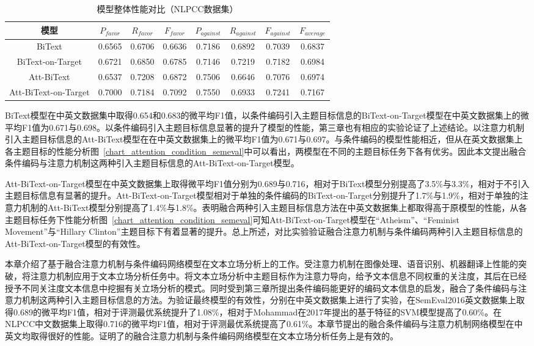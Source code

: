 \begin{table}[htbp]
	\caption[table123]{模型整体性能对比（NLPCC数据集）}
	\label{nlcpp_all_model1}
	\vspace{0.5em}\centering\wuhao
	\begin{tabular}{cccccccc}
		\toprule[1.5pt]
		模型& $P_{favor}$&$R_{favor}$&$F_{favor}$&$P_{against}$&$R_{against}$&$F_{against}$&$F_{average}$ \\
		\midrule[1pt]
		BiText&0.6565&0.6706&0.6636&0.7186&0.6892&0.7039&0.6837\\
		BiText-on-Target&0.6721&0.6850&0.6785&0.7146&0.7219&0.7182&0.6984\\
		Att-BiText&0.6537&0.7208&0.6872&0.7506&0.6646&0.7076&0.6974\\
		Att-BiText-on-Target&0.7000&0.7184&0.7092&0.7550&0.6933&0.7241&0.7167\\
		\bottomrule[1.5pt]
	\end{tabular}
\end{table}

BiText模型在中英文数据集中取得0.654和0.683的微平均F1值，以条件编码引入主题目标信息的BiText-on-Target模型在中英文数据集上的微平均F1值为0.671与0.698。以条件编码引入主题目标信息显著的提升了模型的性能，第三章也有相应的实验论证了上述结论。以注意力机制引入主题目标信息的Att-BiText模型在在中英文数据集上的微平均F1值为0.671与0.697。与条件编码的模型性能相近，但从在英文数据集上各主题目标的性能分析图~\ref{chart_attention_condition_semeval}中可以看出，两模型在不同的主题目标任务下各有优劣。因此本文提出融合条件编码与注意力机制这两种引入主题目标信息的Att-BiText-on-Target模型。

Att-BiText-on-Target模型在中英文数据集上取得微平均F1值分别为0.689与0.716，相对于BiText模型分别提高了3.5\%与3.3\%，相对于不引入主题目标信息有显著的提升。Att-BiText-on-Target模型相对于单独的条件编码的BiText-on-Target分别提升了1.7\%与1.9\%，相对于单独的注意力机制的Att-BiText模型分别提高了1.4\%与1.8\%。表明融合两种引入主题目标信息方法在中英文数据集上都取得高于原模型的性能，从各主题目标任务下性能分析图~\ref{chart_attention_condition_semeval}可知Att-BiText-on-Target模型在“Atheism”、“Feminist Movement”与“Hillary Clinton”主题目标下有着显著的提升。总上所述，对比实验验证融合注意力机制与条件编码两种引入主题目标信息的Att-BiText-on-Target模型的有效性。


本章介绍了基于融合注意力机制与条件编码网络模型在文本立场分析上的工作。受注意力机制在图像处理、语音识别、机器翻译上性能的突破，将注意力机制应用于文本立场分析任务中。将文本立场分析中主题目标作为注意力导向，给予文本信息不同权重的关注度，其后在已经授予不同关注度文本信息中挖掘有关立场分析的模式。同时受到第三章所提出条件编码能更好的编码文本信息的启发，融合了条件编码与注意力机制这两种引入主题目标信息的方法。为验证最终模型的有效性，分别在中英文数据集上进行了实验，在SemEval2016英文数据集上取得0.689的微平均F1值，相对于评测最优系统提升了1.08\%，相对于Mohammad在2017年提出的基于特征的SVM模型提高了0.60\%。在NLPCC中文数据集上取得0.716的微平均F1值，相对于评测最优系统提高了0.61\%。本章节提出的融合条件编码与注意力机制网络模型在中英文均取得很好的性能。证明了的融合注意力机制与条件编码网络模型在文本立场分析任务上是有效的。



